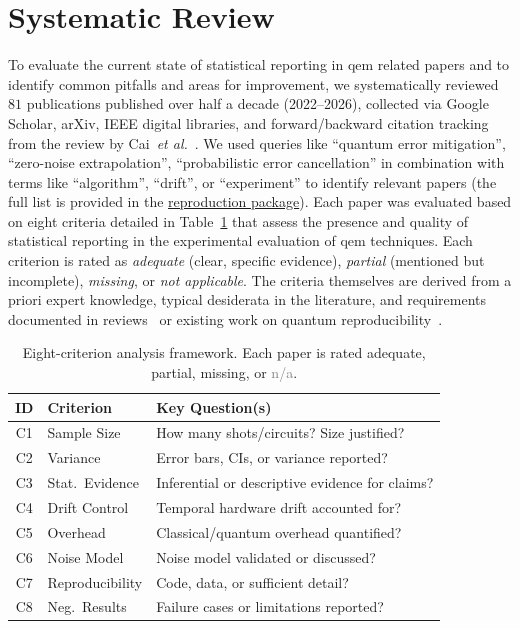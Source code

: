 \documentclass[10pt,conference]{IEEEtran}
\newcommand{\repro}{\href{https://github.com/lfd/qce26_claim_against_measurement}{reproduction package\xspace}}
\newcommand{\na}{\textcolor{gray}{n/a}}
\newcommand{\etal}{\emph{et al.}\xspace}
\begin{document}
\section{Systematic Review}\label{sec:review}
To evaluate the current state of statistical reporting in \gls{qem} related papers and to identify common pitfalls and areas for improvement, we systematically reviewed $81$ publications published over half a decade (2022--2026), collected via Google Scholar, arXiv, IEEE digital libraries, and forward/backward citation tracking from the review by Cai~\etal~\cite{cai_quantum_2023}. We used queries like \enquote{quantum error mitigation}, \enquote{zero-noise extrapolation}, \enquote{probabilistic error cancellation} in combination with terms like \enquote{algorithm}, \enquote{drift}, or \enquote{experiment} to identify relevant papers (the full list is provided in the \repro{}). Each paper was evaluated based on eight criteria detailed in Table~\ref{tab:criteria} that assess the presence and quality of statistical reporting in the experimental evaluation of \gls{qem} techniques. Each criterion is rated as \emph{adequate} (clear, specific evidence), \emph{partial} (mentioned but incomplete), \emph{missing}, or \emph{not applicable}. The criteria themselves are derived from a priori expert knowledge, typical desiderata in the literature, and requirements documented in reviews~\cite{murillo_roadmap_2025,carbonelli_challenges_2024,yue_challenges_2023} or existing work on quantum reproducibility~\cite{veiga_repro_2025,gierisch_qef_2026,mauerer_repro_2022}.

\begin{table}[htbp]
  \centering
  \caption{Eight-criterion analysis framework. Each paper is rated adequate, partial, missing, or \na{}.}
  \label{tab:criteria}
  \small
  \begin{tabular}{@{}clp{5.1cm}@{}}
    \toprule
    \textbf{ID} & \textbf{Criterion} & \textbf{Key Question(s)} \\
    \midrule 
    C1 & Sample Size & How many shots/circuits? Size justified? \\
    C2 & Variance & Error bars, CIs, or variance reported? \\
    C3 & Stat.\ Evidence & Inferential or descriptive evidence for claims? \\
    C4 & Drift Control & Temporal hardware drift accounted for? \\
    C5 & Overhead & Classical/quantum overhead quantified? \\
    C6 & Noise Model & Noise model validated or discussed? \\
    C7 & Reproducibility & Code, data, or sufficient detail? \\
    C8 & Neg.\ Results & Failure cases or limitations reported? \\
    \bottomrule
  \end{tabular}
\vspace{-1em}
\end{table}
\end{document}
